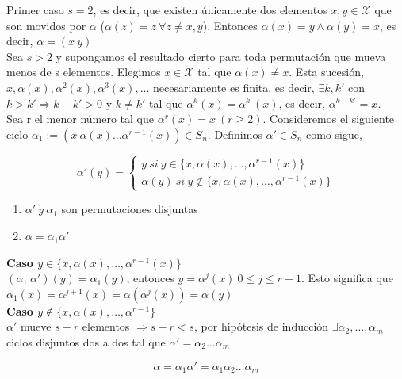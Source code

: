 \documentclass{article}
\begin{document}
Primer caso $s=2$, es decir, que existen únicamente dos elementos $x,y\in \mathcal{X}$ que son movidos por $\alpha$ ($\alpha(z)=z~ \forall z \neq x,y$). Entonces $\alpha(x)=y \wedge \alpha(y)=x$, es decir, $\alpha=(x~y)$ \\

Sea $s>2$ y supongamos el resultado cierto para toda permutación que mueva menos de s elementos. Elegimos $x \in \mathcal{X}$ tal que $\alpha(x) \neq x$. Esta sucesión, $x,\alpha(x),\alpha^2(x),\alpha^3(x),\ldots$ necesariamente es finita, es decir, $\exists k,k'$ con $k>k' \Rightarrow k-k'>0$ y $k \neq k'$ tal que $\alpha^k(x)=\alpha^{k'}(x)$, es decir, $\alpha^{k-k'}=x$. \\

Sea r el menor número tal que $\alpha^r(x)=x~(r\geq 2)$. Consideremos el siguiente ciclo $\alpha_1:=(x~\alpha(x)\ldots \alpha^{r-1}(x))\in S_n$. Definimos $\alpha' \in S_n$ como sigue,

\begin{equation*}
\alpha'(y)=\left\lbrace \begin{array}{c} 
y~si~y\in \{x,\alpha(x),\ldots,\alpha^{r-1}(x)\} \\
\alpha(y)~si~y\notin \{x,\alpha(x),\ldots,\alpha^{r-1}(x)\} \end{array} \right.
\end{equation*}

\begin{enumerate}
\item $\alpha'~y~\alpha_1$ son permutaciones disjuntas
\item $\alpha=\alpha_1 \alpha'$
\end{enumerate}

\textbf{Caso $y \in \{x,\alpha(x),\ldots,\alpha^{r-1}(x)\}$} \\

$(\alpha_1~\alpha')(y)=\alpha_1(y)$, entonces $y=\alpha^j(x)~0\leq j \leq r-1$. Esto significa que $\alpha_1(x)=\alpha^{j+1}(x)=\alpha(\alpha^j(x))=\alpha(y)$ \\

\textbf{Caso $y \notin \{x,\alpha(x),\ldots,\alpha^{r-1}\}$} \\

$\alpha'$ mueve $s-r$ elementos $\Rightarrow s-r<s$, por hipótesis de inducción $\exists \alpha_2,\ldots,\alpha_m$ ciclos disjuntos dos a dos tal que $\alpha'=\alpha_2 \ldots \alpha_m$

\begin{equation*}
\alpha = \alpha_1 \alpha'=\alpha_1 \alpha_2 \ldots \alpha_m
\end{equation*}
\end{document}
